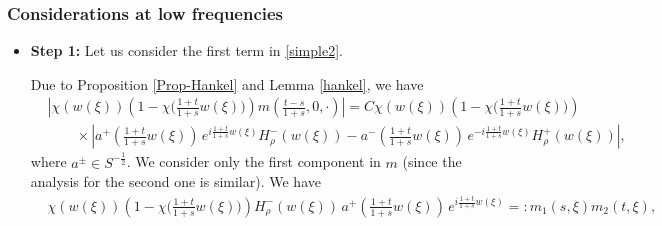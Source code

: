 \documentclass[10pt]{article}
\newcommand{\<}{\langle}
\renewcommand{\>}{\rangle}
\numberwithin{equation}{section}
\begin{document}
\subsubsection{Considerations at low frequencies}
\begin{itemize}
\item \textbf{Step 1:} Let us consider the first term in \eqref{simple2}.

Due to Proposition \ref{Prop-Hankel} and Lemma \ref{hankel}, we have
\begin{align*}
&\left|\chi(w(\xi))\left( 1-\chi\big(\frac{1+t}{1+s}w(\xi)\big) \right)  m\left(\frac{t-s}{1+s}, 0, \cdot\right)\right|=C \chi(w(\xi))\left( 1-\chi\big(\frac{1+t}{1+s}w(\xi)\big) \right) \\
&\qquad \times \left| a^{+}\left(\frac{1+t}{1+s}w(\xi)\right)\, e^{i\frac{1+t}{1+s}w(\xi)} H_{\rho}^{-}(w(\xi))-a^{-}\left(\frac{1+t}{1+s}w(\xi)\right)\, e^{-i\frac{1+t}{1+s}w(\xi)}H_{\rho}^{+}(w(\xi)) \right|,
\end{align*}
where $a^{\pm}\in S^{-\frac12}$. We consider only the first component in $m$ (since the analysis for the second one is similar). We have
\begin{align*}
&\chi(w(\xi))\left( 1-\chi\big(\frac{1+t}{1+s}w(\xi)\big) \right)H_{\rho}^{-}(w(\xi)) \,a^{+}\left(\frac{1+t}{1+s}w(\xi)\right)\, e^{i\frac{1+t}{1+s}w(\xi)} =: m_1(s,\xi)m_2(t,\xi),

\end{align*}
\end{itemize}
\end{document}
